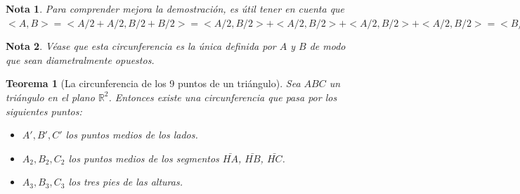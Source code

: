 \documentclass[11pt, a4paper]{article}
\newif\IfInSansMode
\let\oldsf\sffamily
\renewcommand*{\sffamily}{\oldsf\mathversion{sans}\InSansModetrue}
\newcommand{\R}{\mathbb{R}}
\theoremstyle{theorem-style}
\newtheorem{nth}{Teorema}[section]
\theoremstyle{definition-style}
\theoremstyle{remark-style}
\newtheorem*{nota}{Nota}
\theoremstyle{example-style}
\begin{document}
\begin{nota}
	Para comprender mejora la demostración, es útil tener en cuenta que $<A,B> = <A/2+A/2,B/2+B/2> =  <A/2,B/2> + <A/2,B/2> +  <A/2,B/2> + <A/2,B/2> =  <B/2+A/2> + <A/2,B/2>  <B/2,A/2> + <A/2,B/2> = <A/2+B/2, A/2+B/2> = |M|^2$
\end{nota}

\begin{nota}
	Véase que esta circunferencia es la única definida por $A$ y $B$ de modo que sean diametralmente opuestos.
\end{nota}

\begin{nth}[La circunferencia de los 9 puntos de un triángulo]
  Sea $ABC$ un triángulo en el plano $\R^2$. Entonces existe una circunferencia que pasa por los siguientes puntos:
  \begin{itemize}
  \item $A',B',C'$ los puntos medios de los lados.
  \item $A_2,B_2,C_2$ los puntos medios de los segmentos $\bar{HA}$, $\bar{HB}$, $\bar{HC}$.
  \item $A_3,B_3,C_3$ los tres pies de las alturas.
  \end{itemize}
  
  \begin{center}
\end{center}
\end{nth}
\end{document}
